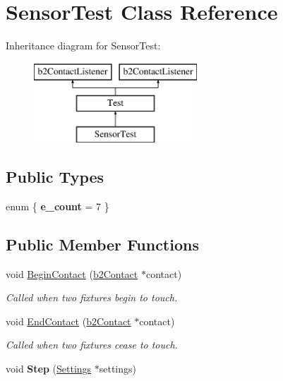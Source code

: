 \hypertarget{class_sensor_test}{\section{Sensor\-Test Class Reference}
\label{class_sensor_test}
}
Inheritance diagram for Sensor\-Test\-:\begin{figure}[H]
\begin{center}
\leavevmode
\includegraphics[height=3.000000cm]{class_sensor_test}
\end{center}
\end{figure}
\subsection*{Public Types}
\begin{DoxyCompactItemize}
\item 
enum \{ {\bfseries e\-\_\-count} =  7
 \}
\end{DoxyCompactItemize}
\subsection*{Public Member Functions}
\begin{DoxyCompactItemize}
\item 
\hypertarget{class_sensor_test_aac1a5751485ef1880b5a850dcfebf4eb}{void \hyperlink{class_sensor_test_aac1a5751485ef1880b5a850dcfebf4eb}{Begin\-Contact} (\hyperlink{classb2_contact}{b2\-Contact} $\ast$contact)}\label{class_sensor_test_aac1a5751485ef1880b5a850dcfebf4eb}

\begin{DoxyCompactList}\small\item\em Called when two fixtures begin to touch. \end{DoxyCompactList}\item 
\hypertarget{class_sensor_test_a1e1721a886148cb36fbb46e2a2eda830}{void \hyperlink{class_sensor_test_a1e1721a886148cb36fbb46e2a2eda830}{End\-Contact} (\hyperlink{classb2_contact}{b2\-Contact} $\ast$contact)}\label{class_sensor_test_a1e1721a886148cb36fbb46e2a2eda830}

\begin{DoxyCompactList}\small\item\em Called when two fixtures cease to touch. \end{DoxyCompactList}\item 
\hypertarget{class_sensor_test_a9ca1c66471361a7cddae0461fd7b7bc4}{void {\bfseries Step} (\hyperlink{struct_settings}{Settings} $\ast$settings)}\label{class_sensor_test_a9ca1c66471361a7cddae0461fd7b7bc4}

\end{DoxyCompactItemize}
